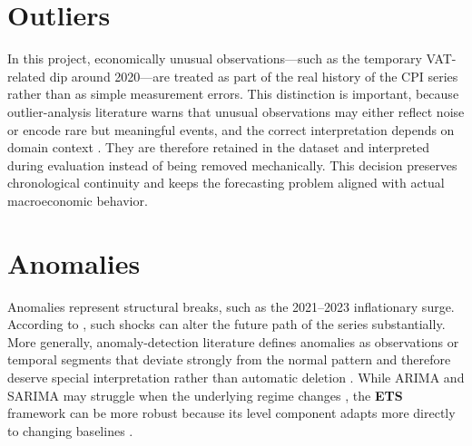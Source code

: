 \section{Outliers}

In this project, economically unusual observations—such as the temporary VAT-related dip around 2020—are treated as part of the real history of the CPI series rather than as simple measurement errors. This distinction is important, because outlier-analysis literature warns that unusual observations may either reflect noise or encode rare but meaningful events, and the correct interpretation depends on domain context \cite{Aggarwal:2017}. They are therefore retained in the dataset and interpreted during evaluation instead of being removed mechanically. This decision preserves chronological continuity and keeps the forecasting problem aligned with actual macroeconomic behavior.

\section{Anomalies}

Anomalies represent structural breaks, such as the 2021--2023 inflationary surge. According to \cite{StockWatson1999}, such shocks can alter the future path of the series substantially. More generally, anomaly-detection literature defines anomalies as observations or temporal segments that deviate strongly from the normal pattern and therefore deserve special interpretation rather than automatic deletion \cite{Chandola:2009}. While ARIMA and SARIMA may struggle when the underlying regime changes \cite{Box2015}, the \textbf{ETS} framework can be more robust because its level component adapts more directly to changing baselines \cite{Hyndman2021}.
